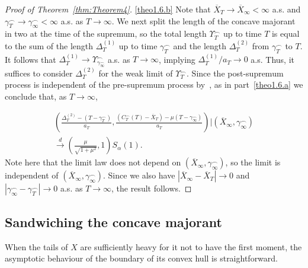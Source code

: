 \documentclass[AHL,Unicode,longabstracts,published]{cedram}
\newcommand\1{\mathds{1}}
\newcommand\cid{\xrightarrow{d}}
\newcommand\ov[1]{\overline{#1}}
\begin{document}
\begin{proof}[Proof of Theorem~\ref{thm:Theorem4}]
\eqref{theo1.6.b} Note that $\ov{X}_T\to\ov{X}_\infty <\infty$ a.s. and $\gamma_T^\frown\to\gamma_\infty^\frown<\infty$ a.s. as $T\to\infty$. We next split the length of the concave majorant in two at the time of the supremum, so the total length $\Upsilon_T^\frown$ up to time $T$ is equal to the sum of the length $\Delta_T^{(1)}$ up to time $\gamma_T^\frown$ and the length $\Delta_T^{(2)}$ from $\gamma_T^\frown$ to $T$. It follows that $\Delta_T^{(1)}\to\Upsilon_{\gamma_\infty^\frown}^\frown$ a.s. as $T\to\infty$, implying $\Delta_T^{(1)}/a_T\to 0$ a.s. Thus, it suffices to consider $\Delta_T^{(2)}$ for the weak limit of $\Upsilon_T^\frown$. Since the post-supremum process is independent of the pre-supremum process by~\cite[Theorem~2.3]{BertoinSplittingSup}, as in part~\eqref{theo1.6.a} we conclude that, as $T\to\infty$,

\begin{multline*}
\left(\frac{\Delta_T^{(2)} -\left(T-\gamma_T^\frown\right)}{a_T},
\frac{\left(C_T^\frown(T)-\ov{X}_T\right) -\mu\left(T-\gamma_\infty^\frown\right)}{a_T}\right)\bigg| \left(\ov{X}_\infty,\gamma_\infty^\frown\right)\\
\cid\left(\frac{\mu}{\sqrt{1+\mu^2}},1\right)S_\alpha(1).
\end{multline*}
Note here that the limit law does not depend on $(\ov{X}_\infty,\gamma_\infty^\frown)$, so the limit is independent of $(\ov{X}_\infty,\gamma_\infty^\frown)$. Since we also have $|\ov X_\infty-\ov X_T|\to 0$ and $|\gamma_\infty^\frown-\gamma_T^\frown|\to 0$ a.s. as $T\to\infty$, the result follows.
\end{proof}


\subsection{Sandwiching the concave majorant}\label{subsec:proof_alpha_less_than_1}
When the tails of $X$ are sufficiently heavy for it not to have the first moment, the asymptotic behaviour of the boundary of its convex hull is straightforward.
\end{document}
